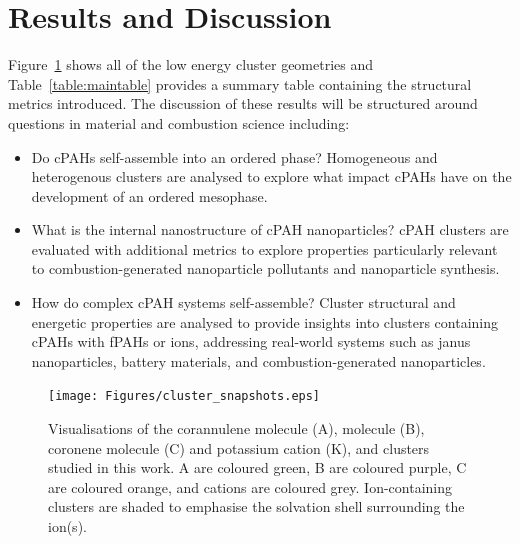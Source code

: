 \section{Results and Discussion}
%
Figure~\ref{fig:clustersnapshots} shows all of the low energy cluster geometries and Table~\ref{table:maintable} provides a summary table containing the structural metrics introduced. The discussion of these results will be structured around questions in material and combustion science including:
\begin{itemize}
\item Do cPAHs self-assemble into an ordered phase? Homogeneous and heterogenous clusters are analysed to explore what impact cPAHs have on the development of an ordered mesophase. 
\item What is the internal nanostructure of cPAH nanoparticles? cPAH clusters are evaluated with additional metrics to explore properties particularly relevant to combustion-generated nanoparticle pollutants and nanoparticle synthesis.
\item How do complex cPAH systems self-assemble? Cluster structural and energetic properties are analysed to provide insights into clusters containing cPAHs with fPAHs or ions, addressing real-world systems such as janus nanoparticles, battery materials, and combustion-generated nanoparticles.
\end{itemize}
%
\begin{figure}[!tbph]
\centering
\texttt{[image: Figures/cluster\_snapshots.eps]}
\caption{Visualisations of the corannulene molecule (A),  molecule (B), coronene molecule (C) and potassium cation (K), and clusters studied in this work. A are coloured green, B are coloured purple, C are coloured orange, and  cations are coloured grey. Ion-containing clusters are shaded to emphasise the solvation shell surrounding the ion(s).}
\label{fig:clustersnapshots}
\end{figure}
%
